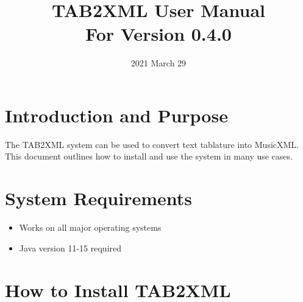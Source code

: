 \documentclass[11pt]{article}
\date{2021 March 29}
\title{TAB2XML User Manual\\\medskip
\large For Version 0.4.0}
\begin{document}
\maketitle
\tableofcontents

\newpage

\section{Introduction and Purpose}
\label{sec:orgd0dec57}
The TAB2XML system can be used to convert text tablature into MusicXML.  This document outlines how to install and use the system in many use cases.
\section{System Requirements}
\label{sec:org97fc934}
\begin{itemize}
\item Works on all major operating systems
\item Java version 11-15 required
\end{itemize}
\section{How to Install TAB2XML}
\label{sec:orga54cca2}
\end{document}
